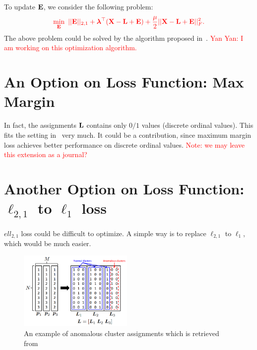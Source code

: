 \documentclass[letterpaper]{article}
\def\bE{{\bf E}}
\def\blambda{{\bm \lambda}}
\def\bL{{\bf L}}
\def\bX{{\bf X}}
\def\bX{{\bf X}}
\def\yanred{\textcolor{red}}
\begin{document}
To update $\bE$, we consider the following problem:
\begin{align}\label{eq:problem_E}
  \yanred{
  \min_{\bE} ~ || \bE ||_{2,1} + \blambda^{\top} (\bX - \bL + \bE) + \frac{\mu}{2} || \bX - \bL + \bE ||_F^2   .
  }
\end{align}
\noindent
The above problem could be solved by the algorithm proposed in~\cite{nienips2010efficient,yangijcai2011l21}.
\yanred{Yan Yan: I am working on this optimization algorithm.}



\section{An Option on Loss Function: Max Margin}

In fact, the assignments $\bL$ contains only $0/1$ values (discrete ordinal values).
This fits the setting in~\cite{yanijcai2015scalable} very much.
It could be a contribution, since maximum margin loss achieves better performance on discrete ordinal values.
\yanred{Note: we may leave this extension as a journal?}



\section{Another Option on Loss Function: $\ell_{2,1}$ to $\ell_1$ loss}

$ell_{2,1}$ loss could be difficult to optimize.
A simple way is to replace $\ell_{2,1}$ to $\ell_1$, which would be much easier.


\begin{figure}
  \centering
  \includegraphics[width=0.49\textwidth]{anomalous_clusters.png}
  \caption{An example of anomalous cluster assignments which is retrieved from~\cite{gaoijcai2016robust}}\label{fig:anomalous_cluster}
\end{figure}







\begin{quote}
\begin{small}
  
  
\end{small}
\end{quote}
\end{document}

